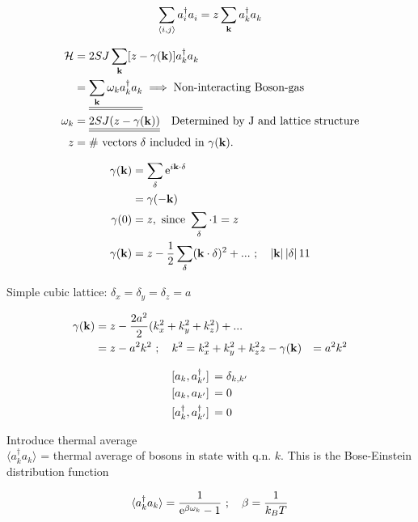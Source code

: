 \begin{equation}
    \sum_{\langle i, j \rangle} a_i^\dagger a_i^{} = z\sum_{\vb{k}}a_k^\dagger a_k^{}
\end{equation}

\begin{align}
    \Ha &= 2SJ\sum_{\vb{k}}[z-\gamma(\vb{k})]a_k^\dagger a_k^{} \\
    &= \uline{\uline{\sum_{\vb{k}}\omega_k a_k^\dagger a_k^{}}} \implies \text{Non-interacting Boson-gas}\\
    \omega_k &= \uline{\uline{2SJ(z-\gamma(\vb{k}))}} \quad \text{Determined by J and lattice structure} \\
    z &= \# \text{ vectors } \vb{\delta} \text{ included in } \gamma(\vb{k}).
\end{align}

\begin{align}
    \gamma(\vb{k}) &= \sum_{\vb{\delta}}\mathrm{e}^{i\vb{k}\cdot\vb{\delta}} \\
    &= \gamma(-\vb{k}) \\
    \gamma(0) &= z, \text{ since } \sum_{\vb{\delta}}\cdot 1 = z \\
    \gamma(\vb{k}) &= z - \frac{1}{2}\sum_{\vb{\delta}}(\vb{k}\cdot\vb{\delta})^2 + ... \ ; \quad \abs*{\vb{k}}\abs*{\vb{\delta}} 1 1
\end{align}

Simple cubic lattice: \quad $\delta_x = \delta_y = \delta_z = a$

\begin{align}
    \gamma(\vb{k}) &= z - \frac{2a^2}{2}(k_x^2 + k_y^2 + k_z^2) + ... \\
    &= z - a^2 k^2 \ ; \quad k^2 = k_x^2 + k_y^2 + k_z^2
    z - \gamma(\vb{k}) &= a^2 k^2
\end{align}

\begin{align}
    \comm*{a_k}{a_{k'}^\dagger} &= \delta_{k, k'} \\
    \comm*{a_k}{a_{k'}} &= 0 \\
    \comm*{a_k^\dagger}{a_{k'}^\dagger} &= 0
\end{align}

Introduce thermal average \\ 
 $\langle a_k^\dagger a_k \rangle$ = thermal average of bosons in state with q.n. $k$. This is the Bose-Einstein distribution function

\begin{equation}
    \langle a_k^\dagger a_k \rangle = \frac{1}{\mathrm{e}^{\beta \omega_k} - 1} \ ; \quad \beta = \frac{1}{k_B T}
\end{equation}

